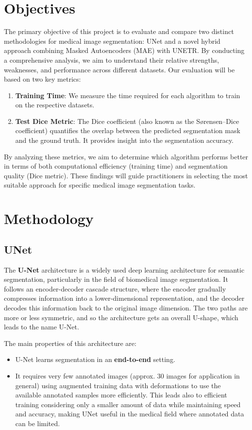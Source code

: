 \section{Objectives}
The primary objective of this project is to evaluate and compare two distinct methodologies for medical image segmentation: UNet and a novel hybrid approach combining Masked Autoencoders (MAE) with UNETR. By conducting a comprehensive analysis, we aim to understand their relative strengths, weaknesses, and performance across different datasets.
Our evaluation will be based on two key metrics:
\begin{enumerate}
    \item \textbf{Training Time}: We measure the time required for each algorithm to train on the respective datasets.
    \item \textbf{Test Dice Metric}: The Dice coefficient (also known as the Sørensen–Dice coefficient) quantifies the overlap between the predicted segmentation mask and the ground truth. It provides insight into the segmentation accuracy.
\end{enumerate}
By analyzing these metrics, we aim to determine which algorithm performs better in terms of both computational efficiency (training time) and segmentation quality (Dice metric). These findings will guide practitioners in selecting the most suitable approach for specific medical image segmentation tasks.

\section{Methodology}

\subsection{UNet}

The \textbf{U-Net} architecture \cite{ronneberger2015u} is a widely used deep learning architecture for semantic segmentation, particularly in the field of biomedical image segmentation. It follows an encoder-decoder cascade structure, where the encoder gradually compresses information into a lower-dimensional representation, and the decoder decodes this information back to the original image dimension. The two paths are more or less symmetric, and so the architecture gets an overall U-shape, which leads to the name U-Net.

The main properties of this architecture are:
\begin{itemize}
    \item U-Net learns segmentation in an \textbf{end-to-end} setting.
    \item It requires very few annotated images (approx. 30 images for application in general) using augmented training data with deformations to use the available annotated samples more efficiently. This leads also to efficient training considering only a smaller amount of data while maintaining speed and accuracy, making UNet useful in the medical field where annotated data can be limited.
\end{itemize}

